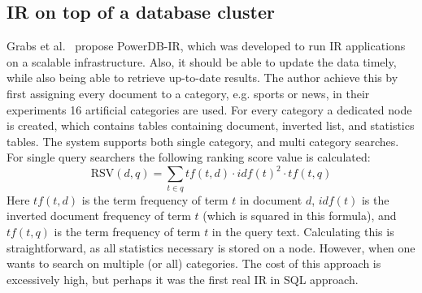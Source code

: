 \subsection{IR on top of a database cluster}
Grabs et al.~\cite{PowerDB-IR} propose PowerDB-IR, which was developed to run IR applications on a scalable infrastructure. Also, it should be able to update the data timely, while also being able to retrieve up-to-date results. The author achieve this by first assigning every document to a category, e.g. sports or news, in their experiments 16 artificial categories are used. For every category a dedicated node is created, which contains tables containing document, inverted list, and statistics tables. 
The system supports both single category, and multi category searches. For single query searchers the following ranking score value is calculated:
\begin{equation}
	\text{RSV}(d,q) = \sum_{t\in q} tf(t, d) \cdot idf(t)^2 \cdot tf(t, q)
\end{equation}
Here $tf(t, d)$ is the term frequency of term $t$ in document $d$, $idf(t)$ is the inverted document frequency of term $t$ (which is squared in this formula), and $tf(t, q)$ is the term frequency of term $t$ in the query text. Calculating this is straightforward, as all statistics necessary is stored on a node. However, when one wants to search on multiple (or all) categories.
The cost of this approach is excessively high, but perhaps it was the first real IR in SQL approach. 

